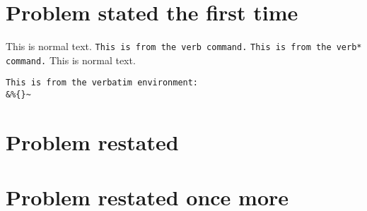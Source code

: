 \documentclass{article}
\begin{document}
\section{Problem stated the first time}
\begin{scontents}[print-env=true,store-env=problem]
This is normal text.
\verb|This is from the verb command.|
\verb*|This is from the verb* command.|
This is normal text.
\begin{verbatim}
This is from the verbatim environment:
&%{}~
\end{verbatim}
\end{scontents}
\section{Problem restated}
\section{Problem restated once more}
\end{document}
